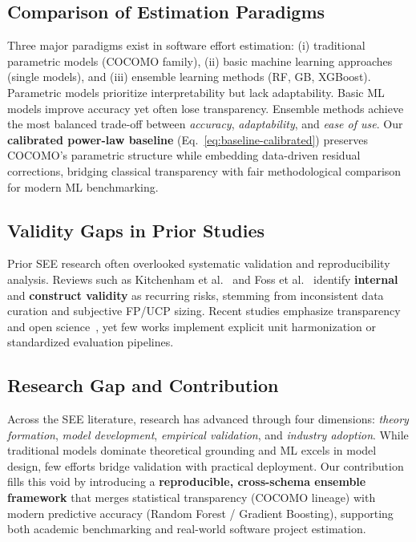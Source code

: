 \documentclass{ieeeaccess}
\begin{document}
\subsection{Comparison of Estimation Paradigms}

Three major paradigms exist in software effort estimation: 
(i) traditional parametric models (COCOMO family), 
(ii) basic machine learning approaches (single models), and 
(iii) ensemble learning methods (RF, GB, XGBoost).  
Parametric models prioritize interpretability but lack adaptability.  
Basic ML models improve accuracy yet often lose transparency.  
Ensemble methods achieve the most balanced trade-off between 
\textit{accuracy}, \textit{adaptability}, and \textit{ease of use}.  
Our \textbf{calibrated power-law baseline} (Eq.~\ref{eq:baseline-calibrated}) preserves COCOMO's parametric structure 
while embedding data-driven residual corrections, 
bridging classical transparency with fair methodological comparison for modern ML benchmarking.

\subsection{Validity Gaps in Prior Studies}

Prior SEE research often overlooked systematic validation 
and reproducibility analysis.  
Reviews such as Kitchenham et al.~\cite{kitchenham2001evaluating} 
and Foss et al.~\cite{foss2003bias} identify 
\textbf{internal} and \textbf{construct validity} as recurring risks, 
stemming from inconsistent data curation and subjective FP/UCP sizing.  
Recent studies emphasize transparency and open science~\cite{nair2020open,cruz2019open}, 
yet few works implement explicit unit harmonization 
or standardized evaluation pipelines.
\subsection{Research Gap and Contribution}

Across the SEE literature, research has advanced through four dimensions:
\textit{theory formation}, \textit{model development}, 
\textit{empirical validation}, and \textit{industry adoption}.  
While traditional models dominate theoretical grounding 
and ML excels in model design, 
few efforts bridge validation with practical deployment.  
Our contribution fills this void by introducing a 
\textbf{reproducible, cross-schema ensemble framework} 
that merges statistical transparency (COCOMO lineage) 
with modern predictive accuracy (Random Forest / Gradient Boosting), 
supporting both academic benchmarking and 
real-world software project estimation.
\end{document}
